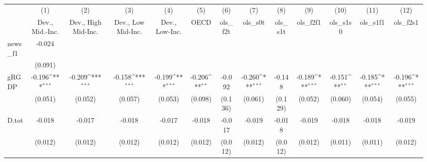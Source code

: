 {
\def\sym#1{\ifmmode^{#1}\else\(^{#1}\)\fi}
\begin{tabular}{l*{12}{c}}
\toprule
            &\multicolumn{1}{c}{(1)}&\multicolumn{1}{c}{(2)}&\multicolumn{1}{c}{(3)}&\multicolumn{1}{c}{(4)}&\multicolumn{1}{c}{(5)}&\multicolumn{1}{c}{(6)}&\multicolumn{1}{c}{(7)}&\multicolumn{1}{c}{(8)}&\multicolumn{1}{c}{(9)}&\multicolumn{1}{c}{(10)}&\multicolumn{1}{c}{(11)}&\multicolumn{1}{c}{(12)}\\
            &\multicolumn{1}{c}{Dev., Mid.-Inc.}&\multicolumn{1}{c}{Dev., High Mid-Inc.}&\multicolumn{1}{c}{Dev., Low Mid-Inc.}&\multicolumn{1}{c}{Dev., Low-Inc.}&\multicolumn{1}{c}{OECD}&\multicolumn{1}{c}{ols\_f2t}&\multicolumn{1}{c}{ols\_s0t}&\multicolumn{1}{c}{ols\_s1t}&\multicolumn{1}{c}{ols\_f2f1}&\multicolumn{1}{c}{ols\_s1s0}&\multicolumn{1}{c}{ols\_s1f1}&\multicolumn{1}{c}{ols\_f2s1}\\
\midrule
news\_f1     &      -0.024         &                     &                     &                     &                     &                     &                     &                     &                     &                     &                     &                     \\
            &     (0.091)         &                     &                     &                     &                     &                     &                     &                     &                     &                     &                     &                     \\
\addlinespace
gRGDP       &      -0.196\sym{***}&      -0.209\sym{***}&      -0.158\sym{***}&      -0.199\sym{***}&      -0.206\sym{**} &      -0.092         &      -0.260\sym{***}&      -0.148         &      -0.189\sym{***}&      -0.151\sym{**} &      -0.185\sym{***}&      -0.196\sym{***}\\
            &     (0.051)         &     (0.052)         &     (0.057)         &     (0.053)         &     (0.098)         &     (0.136)         &     (0.061)         &     (0.129)         &     (0.052)         &     (0.060)         &     (0.054)         &     (0.055)         \\
\addlinespace
D.tot       &      -0.018         &      -0.017         &      -0.018         &      -0.017         &      -0.018         &      -0.017         &      -0.019         &      -0.018         &      -0.019         &      -0.018         &      -0.018         &      -0.019         \\
            &     (0.012)         &     (0.012)         &     (0.012)         &     (0.012)         &     (0.012)         &     (0.012)         &     (0.012)         &     (0.012)         &     (0.012)         &     (0.011)         &     (0.011)         &     (0.012)         \\

\end{tabular}}
